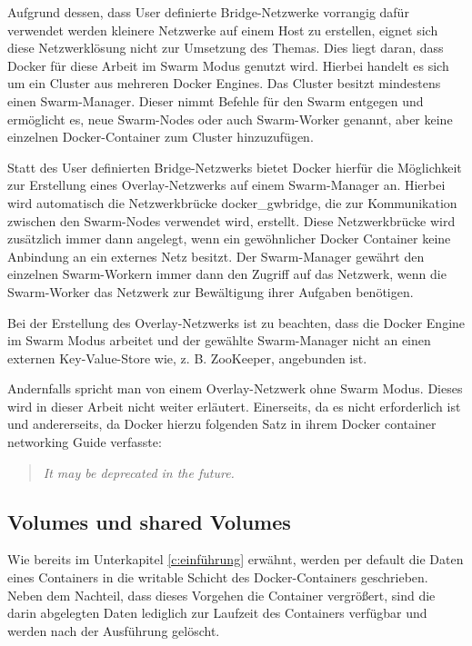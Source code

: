Aufgrund dessen, dass User definierte Bridge-Netzwerke vorrangig dafür verwendet werden kleinere Netzwerke auf einem Host zu erstellen, eignet sich diese Netzwerklösung nicht zur Umsetzung des Themas.
Dies liegt daran, dass Docker für diese Arbeit im Swarm Modus genutzt wird.
Hierbei handelt es sich um ein Cluster aus mehreren Docker Engines.
Das Cluster besitzt mindestens einen Swarm-Manager.
Dieser nimmt Befehle für den Swarm entgegen und ermöglicht es, neue Swarm-Nodes oder auch Swarm-Worker genannt, aber keine einzelnen Docker-Container zum Cluster hinzuzufügen.

Statt des User definierten Bridge-Netzwerks bietet Docker hierfür die Möglichkeit zur Erstellung eines Overlay-Netzwerks auf einem Swarm-Manager an.
Hierbei wird automatisch die Netzwerkbrücke docker\_gwbridge, die zur Kommunikation zwischen den Swarm-Nodes verwendet wird, erstellt.
Diese Netzwerkbrücke wird zusätzlich immer dann angelegt, wenn ein gewöhnlicher Docker Container keine Anbindung an ein externes Netz besitzt.
Der Swarm-Manager gewährt den einzelnen Swarm-Workern immer dann den Zugriff auf das Netzwerk, wenn die Swarm-Worker das Netzwerk zur Bewältigung ihrer Aufgaben benötigen. 

Bei der Erstellung des Overlay-Netzwerks ist zu beachten, dass die Docker Engine im Swarm Modus arbeitet und der gewählte Swarm-Manager nicht an einen externen Key-Value-Store wie, z. B. ZooKeeper, angebunden ist.

Andernfalls spricht man von einem Overlay-Netzwerk ohne Swarm Modus.
Dieses wird in dieser Arbeit nicht weiter erläutert.
Einerseits, da es nicht erforderlich ist und andererseits, da Docker hierzu folgenden Satz in ihrem Docker container networking Guide verfasste:

\begin{quote}
	\textit{\glqq{}It may be deprecated in the future.\grqq{}}
\end{quote}

\subsection{Volumes und shared Volumes}

Wie bereits im Unterkapitel \ref{c:einführung} erwähnt, werden per default die Daten eines Containers in die writable Schicht des Docker-Containers geschrieben. 
Neben dem Nachteil, dass dieses Vorgehen die Container vergrößert, sind die darin abgelegten Daten lediglich zur Laufzeit des Containers verfügbar und werden nach der Ausführung gelöscht.

